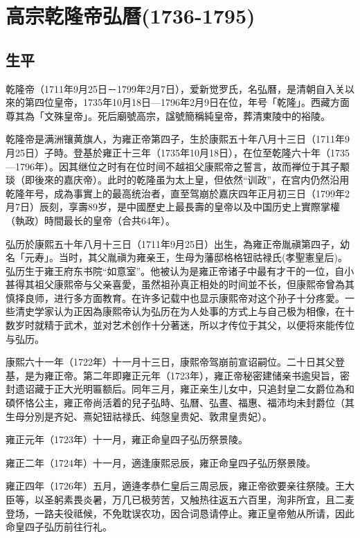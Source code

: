 
\section{高宗乾隆帝弘曆\tiny(1736-1795)}

\subsection{生平}

乾隆帝（1711年9月25日－1799年2月7日），爱新觉罗氏，名弘曆，是清朝自入关以來的第四位皇帝，1735年10月18日—1796年2月9日在位，年号「乾隆」。西藏方面尊其為「文殊皇帝」。死后廟號高宗，諡號簡稱純皇帝，葬清東陵中的裕陵。

乾隆帝是满洲镶黄旗人，为雍正帝第四子，生於康熙五十年八月十三日（1711年9月25日）子時。登基於雍正十三年（1735年10月18日），在位至乾隆六十年（1735—1796年）。因其继位之时有在位时间不越祖父康熙帝之誓言，故而禅位于其子颙琰（即後來的嘉庆帝）。此时的乾隆虽为太上皇，但依然“训政”，在宫内仍然沿用乾隆年号，成為事實上的最高统治者，直至驾崩於嘉庆四年正月初三日（1799年2月7日）辰刻，享壽89岁，是中國歷史上最長壽的皇帝以及中国历史上實際掌權（執政）時間最长的皇帝（合共64年）。

弘历於康熙五十年八月十三日（1711年9月25日）出生，為雍正帝胤禛第四子，幼名「元寿」。当时，其父胤禛为雍亲王，生母为藩邸格格钮祜禄氏(孝聖憲皇后)。弘历生于雍王府东书院“如意室”。他被认为是雍正帝诸子中最有才干的一位，自小甚得其祖父康熙帝与父亲喜愛，虽然祖孙真正相处的时间並不长，但康熙帝曾為其慎择良师，进行多方面教育。在许多记载中也显示康熙帝对这个孙子十分疼愛。一些清史学家认为正因為康熙帝认为弘历在为人处事的方式上与自己极为相像，在十数岁时就精于武术，並对艺术创作十分著迷，所以才传位于其父，以便将來能传位与弘历。

康熙六十一年（1722年）十一月十三日，康熙帝驾崩前宣诏嗣位。二十日其父登基，是为雍正帝。第二年即雍正元年（1723年），雍正帝秘密建储亲书逾臾旨，密封遗诏藏于正大光明匾额后。同年三月，雍正亲生儿女中，只追封皇二女爵位為和碩怀恪公主，雍正帝尚活着的兒子弘時、弘曆、弘晝、福惠、福沛均未封爵位（其生母分別是齐妃、熹妃钮祜禄氏、纯愨皇贵妃、敦肃皇贵妃）。

雍正元年（1723年）十一月，雍正命皇四子弘历祭景陵。

雍正二年（1724年）十一月，適逢康熙忌辰，雍正命皇四子弘历祭景陵。

雍正四年（1726年）五月，適逄孝恭仁皇后三周忌辰，雍正帝欲要亲往祭陵。王大臣等，以圣躬素畏炎暑，万几已极劳苦，又触热往返五六百里，洵非所宜，且二麦登场，一路夫役祗候，不免耽误农功，因合词恳请停止。雍正皇帝勉从所请，因此命皇四子弘历前往行礼。

